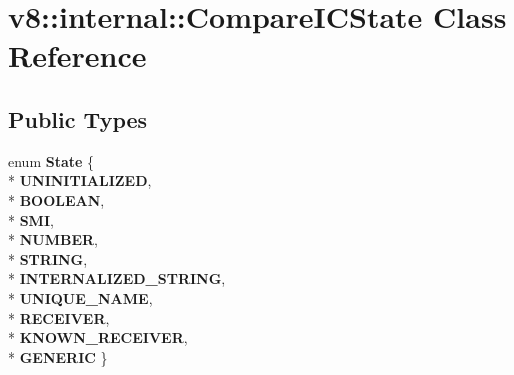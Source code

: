 \hypertarget{classv8_1_1internal_1_1_compare_i_c_state}{}\section{v8\+:\+:internal\+:\+:Compare\+I\+C\+State Class Reference}
\label{classv8_1_1internal_1_1_compare_i_c_state}
\subsection*{Public Types}
\begin{DoxyCompactItemize}
\item 
enum {\bfseries State} \{ \\*
{\bfseries U\+N\+I\+N\+I\+T\+I\+A\+L\+I\+Z\+ED}, 
\\*
{\bfseries B\+O\+O\+L\+E\+AN}, 
\\*
{\bfseries S\+MI}, 
\\*
{\bfseries N\+U\+M\+B\+ER}, 
\\*
{\bfseries S\+T\+R\+I\+NG}, 
\\*
{\bfseries I\+N\+T\+E\+R\+N\+A\+L\+I\+Z\+E\+D\+\_\+\+S\+T\+R\+I\+NG}, 
\\*
{\bfseries U\+N\+I\+Q\+U\+E\+\_\+\+N\+A\+ME}, 
\\*
{\bfseries R\+E\+C\+E\+I\+V\+ER}, 
\\*
{\bfseries K\+N\+O\+W\+N\+\_\+\+R\+E\+C\+E\+I\+V\+ER}, 
\\*
{\bfseries G\+E\+N\+E\+R\+IC}
 \}\hypertarget{classv8_1_1internal_1_1_compare_i_c_state_a5c8ddefa1714dc44d8fa582852c0dd48}{}\label{classv8_1_1internal_1_1_compare_i_c_state_a5c8ddefa1714dc44d8fa582852c0dd48}

\end{DoxyCompactItemize}

